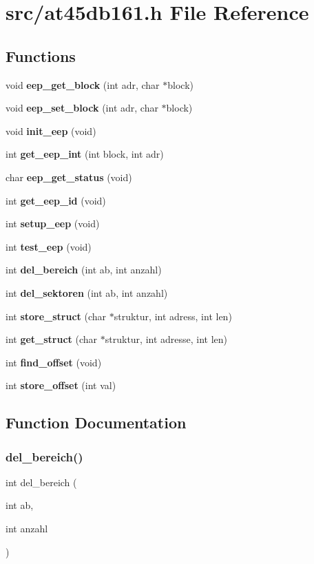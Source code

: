 \section{src/at45db161.h File Reference}
\label{at45db161_8h}
\subsection*{Functions}
\begin{DoxyCompactItemize}
\item 
void \textbf{ eep\+\_\+get\+\_\+block} (int adr, char $\ast$block)
\item 
void \textbf{ eep\+\_\+set\+\_\+block} (int adr, char $\ast$block)
\item 
void \textbf{ init\+\_\+eep} (void)
\item 
int \textbf{ get\+\_\+eep\+\_\+int} (int block, int adr)
\item 
char \textbf{ eep\+\_\+get\+\_\+status} (void)
\item 
int \textbf{ get\+\_\+eep\+\_\+id} (void)
\item 
int \textbf{ setup\+\_\+eep} (void)
\item 
int \textbf{ test\+\_\+eep} (void)
\item 
int \textbf{ del\+\_\+bereich} (int ab, int anzahl)
\item 
int \textbf{ del\+\_\+sektoren} (int ab, int anzahl)
\item 
int \textbf{ store\+\_\+struct} (char $\ast$struktur, int adress, int len)
\item 
int \textbf{ get\+\_\+struct} (char $\ast$struktur, int adresse, int len)
\item 
int \textbf{ find\+\_\+offset} (void)
\item 
int \textbf{ store\+\_\+offset} (int val)
\end{DoxyCompactItemize}


\subsection{Function Documentation}
\mbox{\label{at45db161_8h_addb71e38f4824f0f7b777d1f1460a24f}} 
\subsubsection{del\+\_\+bereich()}
{\footnotesize\ttfamily int del\+\_\+bereich (\begin{DoxyParamCaption}\item[{int}]{ab,  }\item[{int}]{anzahl }\end{DoxyParamCaption})}




